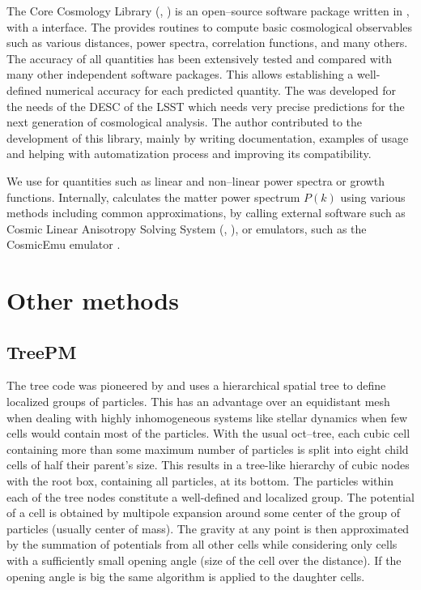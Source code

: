 The Core Cosmology Library (, \textcite{2019ApJS..242....2C}) is an open--source software package written in , with a  interface. The  provides routines to compute basic cosmological observables such as various distances, power spectra, correlation functions, and many others. The accuracy of all quantities has been extensively tested and compared with many other independent software packages. This allows establishing a well-defined numerical accuracy for each predicted quantity. The  was developed for the needs of the DESC of the LSST which needs very precise predictions for the next generation of cosmological analysis. The author contributed to the development of this library, mainly by writing documentation, examples of usage and helping with automatization process and improving its compatibility.

We use  for quantities such as linear and non--linear power spectra or growth functions. Internally,  calculates the matter power spectrum  $P(k)$ using various methods including common approximations, by calling external software such as Cosmic Linear Anisotropy Solving System (, \textcite{class}), or emulators, such as the CosmicEmu emulator \parencite{Heitmann:2015xma}.

\section{Other methods}
\subsection{TreePM}
The tree code was pioneered by \textcite{1986Natur.324..446B} and uses a hierarchical spatial tree to define localized groups of particles. This has an advantage over an equidistant mesh when dealing with highly inhomogeneous systems like stellar dynamics when few cells would contain most of the particles. With the usual oct--tree, each cubic cell containing more than some maximum number of particles is split into eight child cells of half their parent's size. This results in a tree-like hierarchy of cubic nodes with the root box, containing all particles, at its bottom. The particles within each of the tree nodes constitute a well-defined and localized group. The potential of a cell is obtained by multipole expansion around some center of the group of particles (usually center of mass). The gravity at any point is then approximated by the summation of potentials from all other cells while considering only cells with a sufficiently small opening angle (size of the cell over the distance). If the opening angle is big the same algorithm is applied to the daughter cells.
